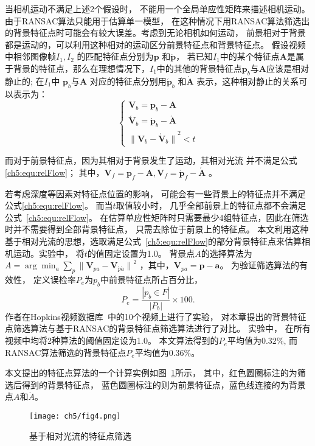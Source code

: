 当相机运动不满足上述2个假设时， 不能用一个全局单应性矩阵来描述相机运动。由于RANSAC算法只能用于估算单一模型， 在这种情况下用RANSAC算法筛选出的背景特征点时可能会有较大误差。考虑到无论相机如何运动， 前景相对于背景都是运动的，可以利用这种相对的运动区分前景特征点和背景特征点。 假设视频中相邻图像帧$I_1,I_2$ 的匹配特征点分别为$\mathbf{p}$ 和$\mathbf{\acute{p}}$， 若已知$I_1$中的某个特征点$\mathbf{A}$是属于背景的特征点，那么在理想情况下，$I_1$中的其他的背景特征点$\mathbf{p}_b$与$\mathbf{A}$应该是相对静止的; 在$I_1$中 $\mathbf{p}_b$与$\mathbf{A}$ 对应的特征点分别用$\mathbf{\acute{p}}_b$ 和$\mathbf{\acute{A}}$ 表示，这种相对静止的关系可以表示为：
\begin{equation}
\label{ch5:equ:relFlow}
\begin{cases}
  \mathbf{V}_b = \mathbf{p}_b - \mathbf{A}  \\
   \mathbf{\acute{V}}_b = \mathbf{\acute{p}}_b - \mathbf{\acute{A}} \\
{\|\mathbf{V}_b-\mathbf{\acute{V}}_b\|}^2 < t
\end{cases}
\end{equation}
	 	
而对于前景特征点，因为其相对于背景发生了运动，其相对光流 并不满足公式\ref{ch5:equ:relFlow}； 其中，$ \mathbf{V}_f = \mathbf{p}_f - \mathbf{A},\mathbf{V}_f = \mathbf{\acute{p}}_f - \mathbf{\acute{A}}$  。\par
若考虑深度等因素对特征点位置的影响， 可能会有一些背景上的特征点并不满足公式\ref{ch5:equ:relFlow}。 而当$t$取值较小时， 几乎全部前景上的特征点都不会满足公式~\ref{ch5:equ:relFlow}。 在估算单应性矩阵时只需要最少4组特征点，因此在筛选时并不需要得到全部背景特征点， 只需去除位于前景上的特征点。 本文利用这种基于相对光流的思想，选取满足公式~\ref{ch5:equ:relFlow}的部分背景特征点来估算相机运动。实验中， 将$t$的值固定设置为1.0。 背景点$A$的选择算法为$A = \arg \min_{a}\sum_{p}{\|\mathbf{V}_{pa} - \mathbf{V}_{\acute{p}\acute{a}}\|}^2$ ，其中，$ \mathbf{V}_{pa} = \mathbf{p} - \mathbf{a}$。 为验证筛选算法的有效性， 定义误检率$P_e$为$p_b$中前景特征点所占百分比，$$P_e= \frac{|p_b \in F |}{|P_b|} \times 100. $$
作者在Hopkins视频数据库~\cite{HopKinsDataSet}中的10个视频上进行了实验， 对本章提出的背景特征点筛选算法与基于RANSAC的背景特征点筛选算法进行了对比。 实验中， 在所有视频中均将2种算法的阈值固定设为1.0。 本文算法得到的$P_e$平均值为$0.32 \%$, 而RANSAC算法筛选的背景特征点$P_e$平均值为$0.36\%$。 \par
本文提出的特征点算法的一个计算实例如图~\ref{ch5:fig:fpFilter}所示， 其中，红色圆圈标注的为筛选后得到的背景特征点， 蓝色圆圈标注的则为前景特征点，蓝色线连接的为背景点$A$和$\acute{A}$。\par
\begin{figure}[htb]
  \centering
  \texttt{[image: ch5/fig4.png]}
  \caption{基于相对光流的特征点筛选}\label{ch5:fig:fpFilter}
\end{figure}


